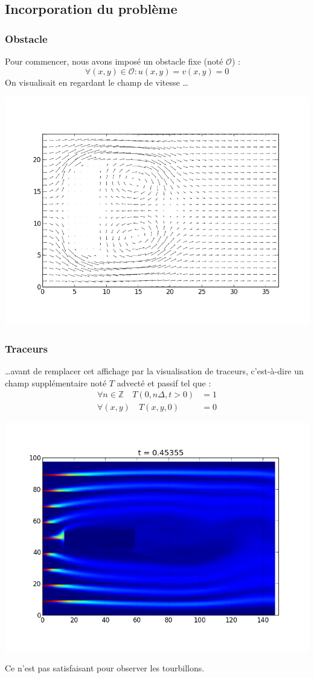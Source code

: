 \documentclass{beamer}
\renewcommand\O{\mathcal{O}}
\begin{document}
  \subsection{Incorporation du problème}
  \begin{frame}
    \frametitle{Obstacle}
    Pour commencer, nous avons imposé un obstacle fixe (noté $\O$) :
    \[ \forall (x,y) \in \O : u(x,y) = v(x,y) = 0 \]
    On visualisait en regardant le champ de vitesse \dots
    \begin{center}
      \includegraphics[height=0.6\textheight]{quiver.png}
    \end{center}
  \end{frame}
  \begin{frame}
    \frametitle{Traceurs}
    \dots avant de remplacer cet affichage par la visualisation de
    traceurs, c'est-à-dire un champ supplémentaire noté $T$ advecté et
    passif tel que :
    \begin{align*}
      \forall n\in \mathbb{Z}\quad T(0,n \Delta, t>0) & = 1\\
      \forall (x,y)\quad T(x,y,0) & = 0
    \end{align*}
    \begin{center}
      \includegraphics[height=0.6\textheight]{tracer0.png}
    \end{center}
    Ce n'est pas satisfaisant pour observer les tourbillons.
  \end{frame}
  
\end{document}
